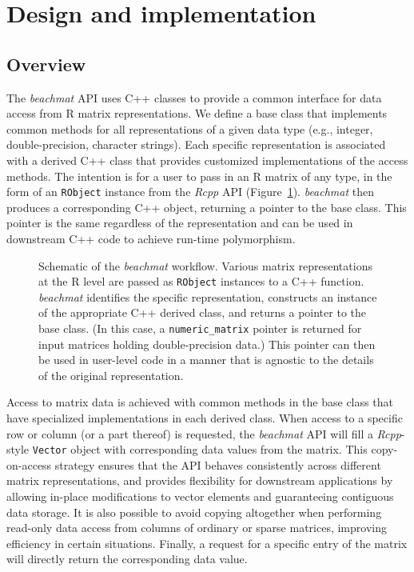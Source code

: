 \documentclass[10pt,letterpaper]{article}
\newcommand{\beachmat}{\textit{beachmat}}
\newcommand{\code}[1]{\texttt{#1}}
\begin{document}
\section*{Design and implementation}

\subsection*{Overview}
The \beachmat{} API uses C++ classes to provide a common interface for data access from R matrix representations.
We define a base class that implements common methods for all representations of a given data type (e.g., integer, double-precision, character strings).
Each specific representation is associated with a derived C++ class that provides customized implementations of the access methods.
The intention is for a user to pass in an R matrix of any type, in the form of an \code{RObject} instance from the \textit{Rcpp} API (Figure~\ref{fig:beachoverview}).
\beachmat{} then produces a corresponding C++ object, returning a pointer to the base class.
This pointer is the same regardless of the representation and can be used in downstream C++ code to achieve run-time polymorphism.

\begin{figure}[b]
    \caption{Schematic of the \beachmat{} workflow.
        Various matrix representations at the R level are passed as \code{RObject} instances to a C++ function.
        \beachmat{} identifies the specific representation, constructs an instance of the appropriate C++ derived class, and returns a pointer to the base class.
        (In this case, a \code{numeric\_matrix} pointer is returned for input matrices holding double-precision data.)
        This pointer can then be used in user-level code in a manner that is agnostic to the details of the original representation.
    }
    \label{fig:beachoverview}
\end{figure}

Access to matrix data is achieved with common methods in the base class that have specialized implementations in each derived class. 
When access to a specific row or column (or a part thereof) is requested, the \beachmat{} API will fill a \textit{Rcpp}-style \code{Vector} object with corresponding data values from the matrix.
This copy-on-access strategy ensures that the API behaves consistently across different matrix representations, and provides flexibility for downstream applications by allowing in-place modifications to vector elements and guaranteeing contiguous data storage. 
It is also possible to avoid copying altogether when performing read-only data access from columns of ordinary or sparse matrices, improving efficiency in certain situations.
Finally, a request for a specific entry of the matrix will directly return the corresponding data value.
\end{document}

